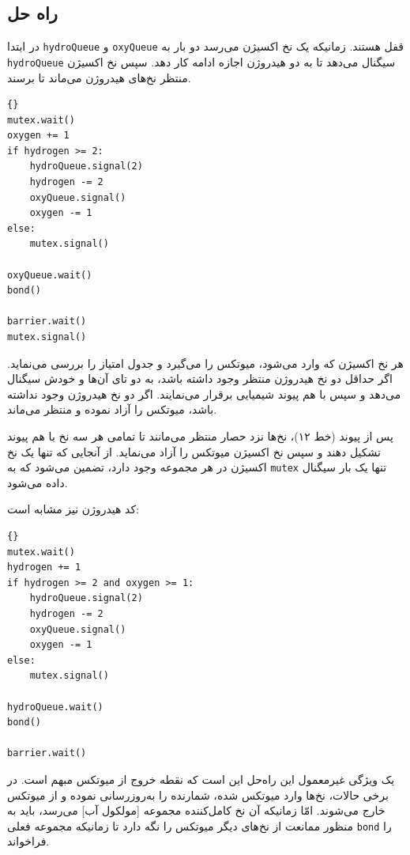 \documentclass{book}
\begin{document}
\subsection {راه حل  }

    در ابتدا {\tt hydroQueue} و {\tt oxyQueue} قفل هستند. زمانیکه یک نخ اکسیژن می‌رسد دو بار به {\tt hydroQueue}  سیگنال می‌دهد تا 
    به دو هیدروژن اجازه ادامه کار دهد. سپس نخ اکسیژن منتظر نخ‌های هیدروژن می‌ماند تا برسند. 

\begin{latin}
\begin{lstlisting}[title=\rl{کد اکسیژن}]{}
mutex.wait()
oxygen += 1
if hydrogen >= 2:
    hydroQueue.signal(2)
    hydrogen -= 2
    oxyQueue.signal()
    oxygen -= 1
else:
    mutex.signal()

oxyQueue.wait()
bond()

barrier.wait()
mutex.signal()
\end{lstlisting}
\end{latin}

    هر نخ اکسیژن که وارد می‌شود، میوتکس را می‌گیرد و جدول امتیاز را بررسی می‌نماید. اگر حداقل دو نخ هیدروژن منتظر وجود داشته باشد، به دو تای آن‌ها و خودش 
    سیگنال می‌دهد و سپس با هم پیوند شیمیایی برقرار می‌نمایند. اگر دو نخ هیدروژن وجود نداشته باشد، میوتکس را آزاد نموده و منتظر می‌ماند. 

    پس از پیوند (خط ۱۲)، نخ‌ها نزد حصار منتظر می‌مانند تا تمامی هر سه نخ با هم پیوند تشکیل دهند و سپس نخ اکسیژن میوتکس را آزاد می‌نماید. 
    از آنجایی که تنها یک نخ اکسیژن در هر مجموعه وجود دارد، تضمین می‌شود که به  {\tt mutex} تنها یک بار سیگنال داده می‌شود. 

    کد هیدروژن نیز مشابه است: 

\begin{latin}
\begin{lstlisting}[title=\rl{کد هیدروژن}]{}
mutex.wait()
hydrogen += 1
if hydrogen >= 2 and oxygen >= 1:
    hydroQueue.signal(2)
    hydrogen -= 2
    oxyQueue.signal()
    oxygen -= 1
else:
    mutex.signal()

hydroQueue.wait()
bond()

barrier.wait()
\end{lstlisting}
\end{latin}

    یک ویژگی غیرمعمول این راه‌حل این است که نقطه خروج از میوتکس مبهم است. در برخی حالات، نخ‌ها وارد میوتکس شده، شمارنده را 
    به‌روزرسانی نموده و از میوتکس خارج می‌شوند. امّا زمانیکه آن نخ کامل‌کننده مجموعه [مولکول آب] می‌رسد، باید به منظور ممانعت از نخ‌های دیگر 
    میوتکس را نگه دارد تا زمانیکه مجموعه فعلی {\tt bond} را فراخواند. 
\end{document}
